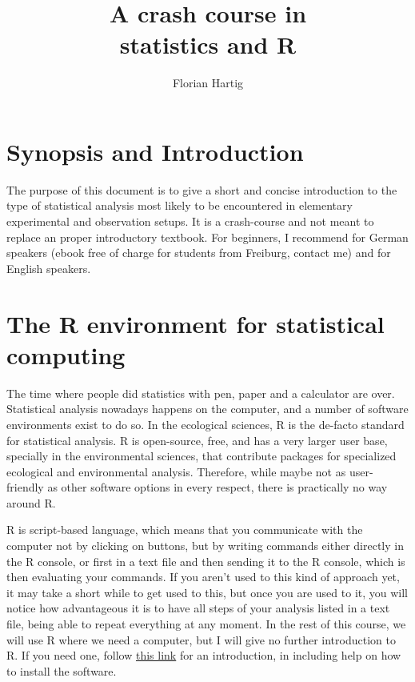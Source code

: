 \documentclass[a4paper,twoside]{tufte-book} %
\title{A crash course in\\statistics and R}
\author{Florian Hartig}
\begin{document}
\let\cleardoublepage\clearpage %
\maketitle
\newpage
\tableofcontents

\chapter{Synopsis and Introduction} %

The purpose of this document is to give a short and concise introduction to the type of statistical analysis most likely to be encountered in elementary experimental and observation setups. It is a crash-course and not meant to replace an proper introductory textbook. For beginners, I recommend \citep{Dormann-ParametrischeStatistik-2013} for German speakers (ebook free of charge for students from Freiburg, contact me) and \citep{Gotelli-PrimerEcologicalStatistics-2004} for English speakers. 
 
\chapter{The R environment for statistical computing}

The time where people did statistics with pen, paper and a calculator are over. Statistical analysis nowadays happens on the computer, and a number of software environments exist to do so. In the ecological sciences, R is the de-facto standard for statistical analysis. R is open-source, free, and has a very larger user base, specially in the environmental sciences, that contribute packages for specialized ecological and environmental analysis. Therefore, while maybe not as user-friendly as other software options in every respect, there is practically no way around R.

R is script-based language, which means that you communicate with the computer not by clicking on buttons, but by writing commands either directly in the R console, or first in a text file and then sending it to the R console, which is then evaluating your commands. If you aren't used to this kind of approach yet, it may take a short while to get used to this, but once you are used to it, you will notice how advantageous it is to have all steps of your analysis listed in a text file, being able to repeat everything at any moment. In the rest of this course, we will use R where we need a computer, but I will give no further introduction to R. If you need one, follow  \href{http://biometry.github.io/APES/R/R10-gettingStarted.html}{this link} for an introduction, in including help on how to install the software.
\end{document}
